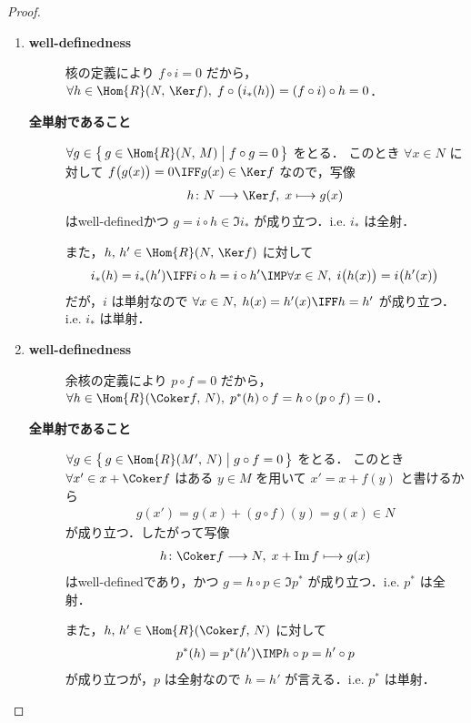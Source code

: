 \documentclass[geometry_main]{subfiles}
\begin{document}
\begin{proof}
	\begin{enumerate}
		\item \begin{description}
			\item[\textbf{well-definedness}] 核の定義により $f \circ i = 0$ だから，$\forall h \in \Hom{R}(N,\, \Ker f),\; f \circ \bigl(i_*(h)\bigr) = (f \circ i) \circ h = 0$．
			\item[\textbf{全単射であること}] $\forall g\in \bigl\{\, g \in \Hom{R}(N,\, M) \bigm| f \circ g = 0 \,\bigr\}$ をとる．
			このとき $\forall x \in N$ に対して $f \bigl( g(x) \bigr) = 0 \IFF g(x) \in \Ker f$ なので，写像
			\begin{align}
				h \colon N \lto \Ker f,\; x \lmto g(x)
			\end{align}
			はwell-definedかつ $g = i \circ h \in \Im i_*$ が成り立つ．i.e. $i_*$ は全射．

			また，$h,\, h' \in \Hom{R}(N,\, \Ker f)$ に対して
			\begin{align}
				i_*(h) = i_*(h') \IFF i \circ h = i \circ h' \IMP \forall x \in N,\; i \bigl( h(x) \bigr) = i \bigl( h'(x) \bigr)
			\end{align}
			だが，$i$ は単射なので $\forall x \in N,\; h(x) = h'(x) \IFF h = h'$ が成り立つ．i.e. $i_*$ は単射．
		\end{description}
		\item \begin{description}
			\item[\textbf{well-definedness}] 余核の定義により $p \circ f  = 0$ だから，$\forall h \in \Hom{R}(\Coker f,\, N),\; p^*(h) \circ f = h \circ (p \circ f) = 0$．
			\item[\textbf{全単射であること}] $\forall g \in \bigl\{\, g \in \Hom{R}(M',\, N) \bigm| g \circ f = 0 \,\bigr\} $ をとる．
			このとき $\forall x' \in x + \Coker f$ はある $y \in M$ を用いて $x' = x + f(y)$ と書けるから
			\begin{align}
				g(x') = g(x) + (g \circ f)(y) = g(x) \in N
			\end{align}
			が成り立つ．したがって写像
			\begin{align}
				h \colon \Coker f \lto N,\; x + \Im f \lmto g(x)
			\end{align}
			はwell-definedであり，かつ $g = h \circ p \in \Im p^*$ が成り立つ．i.e. $p^*$ は全射．

			また，$h,\, h' \in \Hom{R}(\Coker f,\, N)$ に対して
			\begin{align}
				p^*(h) = p^*(h') \IMP h \circ p = h' \circ p
			\end{align}
			が成り立つが，$p$ は全射なので $h = h'$ が言える．i.e. $p^*$ は単射．
		\end{description}
	\end{enumerate}
\end{proof}
\end{document}
